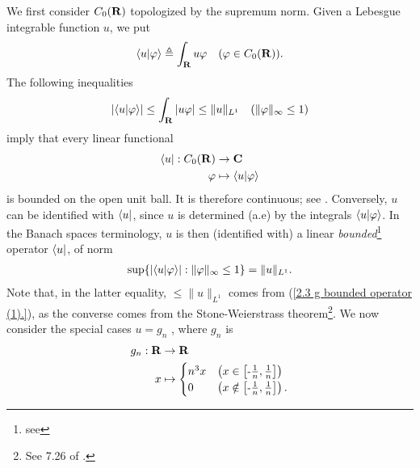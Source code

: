 We first consider %
%
  $C_0({\mathbf R})$ %
%
topologized by the supremum norm. %
Given a Lebesgue integrable function $u$, we put %
  \begin{align}
    \bra{u}\ket{\varphi} 
      \triangleq 
    \int_{\mathbf R} u\varphi  
      \quad(\varphi \in C_0({\mathbf R})).
  \end{align}
%
The following inequalities %
%
  \begin{align}\label{2.3  g  bounded operator (1).}
    \left\lvert\bra{u}\ket{\varphi}\right\rvert 
      \leq 
    \int_{\mathbf R} \left\lvert u\varphi \right\rvert 
      \leq
    \| u \|_{L^1}
      \quad(\|\varphi\|_\infty \leq 1)
  \end{align} 
%
imply that every linear functional 
%
  \begin{align}
    \bra{u}: C_0({\mathbf R}) &\to {\mathbf C} \\
             \varphi    &\mapsto \bra{u}\ket{\varphi} \nonumber
  \end{align}
is bounded on the open unit ball. It is therefore continuous; %
%
  see . %
%
Conversely, ${u}$ can be identified with %
%
  $\bra{u}$, %
%
since $u$ is determined (a.e) by the integrals %
%
  $\bra{u}\ket{\varphi}$. %
%
In the Banach spaces terminology, 
% 
  $u$ is then (identified with) a linear \textit{bounded}\hspace{2pt}\footnote{
    see 
  } %
operator $\bra{u}$, of norm %
%
  \begin{align}\label{2.3  g  bounded operator (2).}
    \sup\{
      \left\lvert \bra{u}\ket{\varphi} \right\rvert
    :  
      \| \varphi \|_\infty \leq 1
    \} =  \| u \|_{L^1}.
  \end{align} 
%
Note that, in the latter equality, $\leq \| u \|_{L^1}$ comes from %
%
  (\ref{2.3  g  bounded operator (1).}), %
%
as the converse comes from the Stone-Weierstrass theorem\footnote{
%
  See 7.26 of \cite{BabyRudin}.
}. %
%
We now consider the special cases %
%
  $u = g_n$ %
%
, where $g_n$ is %
%
  \begin{align}
    g_n : {\mathbf R} & \to {\mathbf R}\\
           x & \mapsto \begin{cases} 
  n^3 x & \left(x \in    \left[\text{\small{-}} \frac{1}{n}, \frac{1}{n}\right]\right)\\
  0     & \left(x \notin \left[\text{\small{-}} \frac{1}{n}, \frac{1}{n}\right]\right).
  \end{cases}\nonumber
  \end{align}
